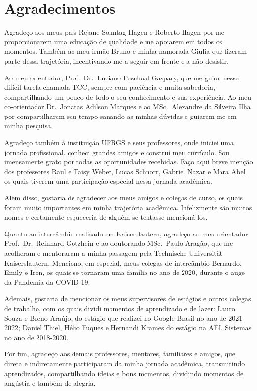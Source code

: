 \chapter*{Agradecimentos}

Agradeço aos meus pais Rejane Sonntag Hagen e Roberto Hagen por me proporcionarem uma educação de qualidade e me apoiarem em todos os momentos. Também ao meu irmão Bruno e minha namorada Giulia que fizeram parte dessa trajetória, incentivando-me a seguir em frente e a não desistir.

Ao meu orientador, Prof.~Dr.~Luciano Paschoal Gaspary, que me guiou nessa difícil tarefa chamada TCC, sempre com paciência e muita sabedoria, compartilhando um pouco de todo o seu conhecimento e sua experiência. Ao meu co-orientador Dr.~Jonatas Adilson Marques e ao MSc.~Alexandre da Silveira Ilha por compartilharem seu tempo sanando as minhas dúvidas e guiarem-me em minha pesquisa.

Agradeço também à instituição UFRGS e seus professores, onde iniciei uma jornada profissional, conheci grandes amigos e construí meu currículo. Sou imensamente grato por todas as oportunidades recebidas. Faço aqui breve menção dos professores Raul e Taisy Weber, Lucas Schnorr, Gabriel Nazar e Mara Abel os quais tiverem uma participação especial nessa jornada acadêmica.

Além disso, gostaria de agradecer aos meus amigos e colegas de curso, os quais foram muito importantes em minha trajetória acadêmica. Infelizmente são muitos nomes e certamente esqueceria de alguém se tentasse mencioná-los.

Quanto ao intercâmbio realizado em Kaiserslautern, agradeço ao meu orientador Prof.~Dr.~Reinhard Gotzhein e ao doutorando MSc.~Paulo Aragão, que me acolheram e mentoraram a minha passagem pela Technische Universität Kaiserslautern. Menciono, em especial, meus colegas de intercâmbio Bernardo, Emily e Iron, os quais se tornaram uma família no ano de 2020, durante o auge da Pandemia da COVID-19.

Ademais, gostaria de mencionar os meus supervisores de estágios e outros colegas de trabalho, com os quais dividi momentos de aprendizado e de lazer: Lauro Souza e Breno Araújo, do estágio que realizei no Google Brasil no ano de 2021-2022; Daniel Thiel, Hélio Fuques e Hernandi Krames do estágio na AEL Sistemas no ano de 2018-2020.

Por fim, agradeço aos demais professores, mentores, familiares e amigos, que direta e indiretamente participaram da minha jornada acadêmica, transmitindo aprendizados, compartilhando ideias e bons momentos, dividindo momentos de angústia e também de alegria.

\clearpage
